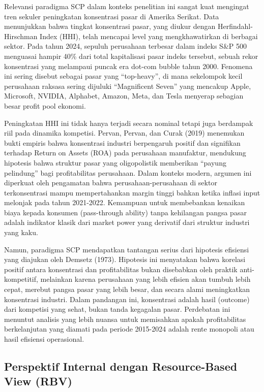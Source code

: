 \documentclass[12pt,a4paper]{report}
\begin{document}
Relevansi paradigma SCP dalam konteks penelitian ini sangat kuat
mengingat tren sekuler peningkatan konsentrasi pasar di Amerika Serikat.
Data menunjukkan bahwa tingkat konsentrasi pasar, yang diukur dengan
Herfindahl-Hirschman Index (HHI), telah mencapai level yang
mengkhawatirkan di berbagai sektor. Pada tahun 2024, sepuluh perusahaan
terbesar dalam indeks S\&P 500 menguasai hampir 40\% dari total
kapitalisasi pasar indeks tersebut, sebuah rekor konsentrasi yang
melampaui puncak era dot-com bubble tahun 2000. Fenomena ini sering
disebut sebagai pasar yang ``top-heavy'', di mana sekelompok kecil
perusahaan raksasa sering dijuluki ``Magnificent Seven'' yang mencakup
Apple, Microsoft, NVIDIA, Alphabet, Amazon, Meta, dan Tesla menyerap
sebagian besar profit pool ekonomi.

Peningkatan HHI ini tidak hanya terjadi secara nominal tetapi juga
berdampak riil pada dinamika kompetisi. Pervan, Pervan, dan Curak (2019)
menemukan bukti empiris bahwa konsentrasi industri berpengaruh positif
dan signifikan terhadap Return on Assets (ROA) pada perusahaan
manufaktur, mendukung hipotesis bahwa struktur pasar yang oligopolistik
memberikan ``payung pelindung'' bagi profitabilitas perusahaan. Dalam
konteks modern, argumen ini diperkuat oleh pengamatan bahwa
perusahaan-perusahaan di sektor terkonsentrasi mampu mempertahankan
margin tinggi bahkan ketika inflasi input melonjak pada tahun 2021-2022.
Kemampuan untuk membebankan kenaikan biaya kepada konsumen (pass-through
ability) tanpa kehilangan pangsa pasar adalah indikator klasik dari
market power yang derivatif dari struktur industri yang kaku.

Namun, paradigma SCP mendapatkan tantangan serius dari hipotesis
efisiensi yang diajukan oleh Demsetz (1973). Hipotesis ini menyatakan
bahwa korelasi positif antara konsentrasi dan profitabilitas bukan
disebabkan oleh praktik anti-kompetitif, melainkan karena perusahaan
yang lebih efisien akan tumbuh lebih cepat, merebut pangsa pasar yang
lebih besar, dan secara alami meningkatkan konsentrasi industri. Dalam
pandangan ini, konsentrasi adalah hasil (outcome) dari kompetisi yang
sehat, bukan tanda kegagalan pasar. Perdebatan ini menuntut analisis
yang lebih nuansa untuk memisahkan apakah profitabilitas berkelanjutan
yang diamati pada periode 2015-2024 adalah rente monopoli atau hasil
efisiensi operasional.

\hypertarget{perspektif-internal-dengan-resource-based-view-rbv}{%
\subsection{Perspektif Internal dengan Resource-Based View
(RBV)}\label{perspektif-internal-dengan-resource-based-view-rbv}}
\end{document}
